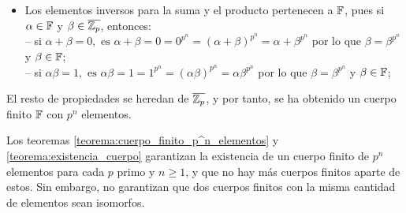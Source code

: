 \begin{dem}{\cite[p.~416]{GamboaAnillos}}
\begin{itemize}
        -- Para el producto se tiene:
        \[
        (\alpha \beta)^{p^n} = \alpha^{p^n}\beta^{p^n} = \alpha \beta \in \F.
        \]

        \item Los elementos inversos para la suma y el producto pertenecen a $\mathbb{F}$, pues si $\alpha\in \mathbb{F}$ y $\beta\in \overline{\mathbb{Z}_p}$, entonces:\\
        -- si $\alpha + \beta = 0, \text{ es } \alpha + \beta = 0 = 0^{p^n} =
        (\alpha + \beta)^{p^n} = \alpha + \beta^{p^n}$
        por lo que $\beta = \beta^{p^n}$ y $\beta\in \mathbb{F}$;\\
        -- si $\alpha \beta = 1, \text{ es } \alpha\beta = 1 = 1^{p^n} =
        (\alpha \beta)^{p^n} = \alpha  \beta^{p^n}$ por lo que $\beta = \beta^{p^n}$ y $\beta\in \mathbb{F}$;
    \end{itemize}
    El resto de propiedades se heredan de $\overline{\mathbb{Z}_p}$, y por tanto, se ha obtenido un cuerpo finito $\mathbb{F}$ con $p^n$ elementos.
\end{dem}

Los teoremas \ref{teorema:cuerpo_finito_p^n_elementos} y \ref{teorema:existencia_cuerpo} garantizan la existencia de un cuerpo finito de $p^n$ elementos para cada $p$ primo y $n\geq 1$, y que no hay más cuerpos finitos aparte de estos. Sin embargo, no garantizan que dos cuerpos finitos con la misma cantidad de elementos sean isomorfos. 

\begin{teorema}\label{Teorema:unicidad}\end{teorema}

